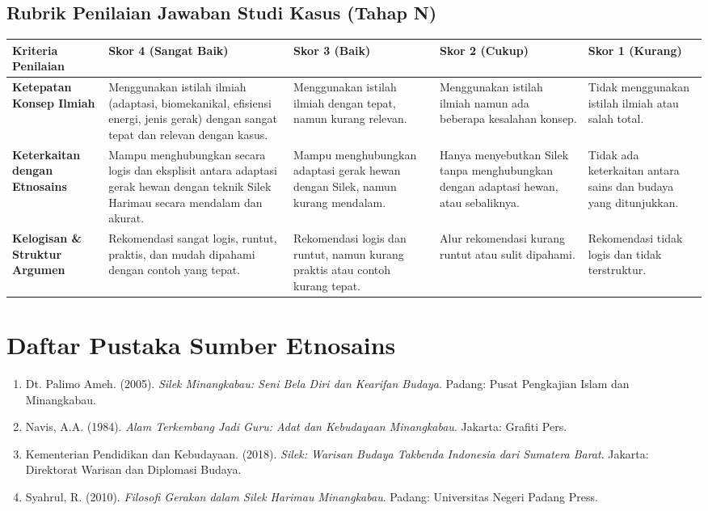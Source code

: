 \documentclass[a4paper,12pt]{article}
\begin{document}
\subsection{Rubrik Penilaian Jawaban Studi Kasus (Tahap N)}

\begin{longtable}{|p{3cm}|p{3cm}|p{3cm}|p{3cm}|p{3cm}|}
\hline
\textbf{Kriteria Penilaian} & \textbf{Skor 4 (Sangat Baik)} & \textbf{Skor 3 (Baik)} & \textbf{Skor 2 (Cukup)} & \textbf{Skor 1 (Kurang)} \\
\hline
\textbf{Ketepatan Konsep Ilmiah} & Menggunakan istilah ilmiah (adaptasi, biomekanikal, efisiensi energi, jenis gerak) dengan sangat tepat dan relevan dengan kasus. & Menggunakan istilah ilmiah dengan tepat, namun kurang relevan. & Menggunakan istilah ilmiah namun ada beberapa kesalahan konsep. & Tidak menggunakan istilah ilmiah atau salah total. \\
\hline
\textbf{Keterkaitan dengan Etnosains} & Mampu menghubungkan secara logis dan eksplisit antara adaptasi gerak hewan dengan teknik Silek Harimau secara mendalam dan akurat. & Mampu menghubungkan adaptasi gerak hewan dengan Silek, namun kurang mendalam. & Hanya menyebutkan Silek tanpa menghubungkan dengan adaptasi hewan, atau sebaliknya. & Tidak ada keterkaitan antara sains dan budaya yang ditunjukkan. \\
\hline
\textbf{Kelogisan \& Struktur Argumen} & Rekomendasi sangat logis, runtut, praktis, dan mudah dipahami dengan contoh yang tepat. & Rekomendasi logis dan runtut, namun kurang praktis atau contoh kurang tepat. & Alur rekomendasi kurang runtut atau sulit dipahami. & Rekomendasi tidak logis dan tidak terstruktur. \\
\hline
\end{longtable}

\section{Daftar Pustaka Sumber Etnosains}

\begin{enumerate}
\item Dt. Palimo Ameh. (2005). \textit{Silek Minangkabau: Seni Bela Diri dan Kearifan Budaya}. Padang: Pusat Pengkajian Islam dan Minangkabau.
\item Navis, A.A. (1984). \textit{Alam Terkembang Jadi Guru: Adat dan Kebudayaan Minangkabau}. Jakarta: Grafiti Pers.
\item Kementerian Pendidikan dan Kebudayaan. (2018). \textit{Silek: Warisan Budaya Takbenda Indonesia dari Sumatera Barat}. Jakarta: Direktorat Warisan dan Diplomasi Budaya.
\item Syahrul, R. (2010). \textit{Filosofi Gerakan dalam Silek Harimau Minangkabau}. Padang: Universitas Negeri Padang Press.
\end{enumerate}
\end{document}

